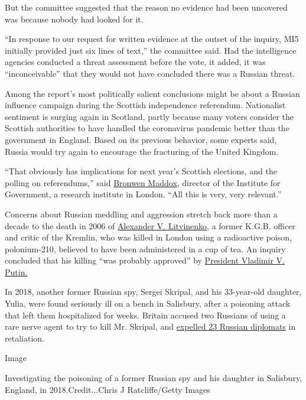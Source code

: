 But the committee suggested that the reason no evidence had been
uncovered was because nobody had looked for it.

``In response to our request for written evidence at the outset of the
inquiry, MI5 initially provided just six lines of text,'' the committee
said. Had the intelligence agencies conducted a threat assessment before
the vote, it added, it was ``inconceivable'' that they would not have
concluded there was a Russian threat.

Among the report's most politically salient conclusions might be about a
Russian influence campaign during the Scottish independence referendum.
Nationalist sentiment is surging again in Scotland, partly because many
voters consider the Scottish authorities to have handled the coronavirus
pandemic better than the government in England. Based on its previous
behavior, some experts said, Russia would try again to encourage the
fracturing of the United Kingdom.

``That obviously has implications for next year's Scottish elections,
and the polling on referendums,'' said
\href{https://www.instituteforgovernment.org.uk/person/bronwen-maddox}{Bronwen
Maddox}, director of the Institute for Government, a research institute
in London. ``All this is very, very relevant.''

Concerns about Russian meddling and aggression stretch back more than a
decade to the death in 2006 of
\href{https://www.nytimes.com/topic/person/alexander-v-litvinenko}{Alexander
V. Litvinenko}, a former K.G.B. officer and critic of the Kremlin, who
was killed in London using a radioactive poison, polonium-210, believed
to have been administered in a cup of tea. An inquiry concluded that his
killing ``was probably approved'' by
\href{https://www.nytimes.com/topic/person/vladimir-putin}{President
Vladimir V. Putin.}

In 2018, another former Russian spy, Sergei Skripal, and his 33-year-old
daughter, Yulia, were found seriously ill on a bench in Salisbury, after
a poisoning attack that left them hospitalized for weeks. Britain
accused two Russians of using a rare nerve agent to try to kill Mr.
Skripal, and
\href{https://www.nytimes.com/2018/03/14/world/europe/uk-russia-spy-punitive-measures.html}{expelled
23 Russian diplomats} in retaliation.

Image

Investigating the poisoning of a former Russian spy and his daughter in
Salisbury, England, in 2018.Credit...Chris J Ratcliffe/Getty Images

